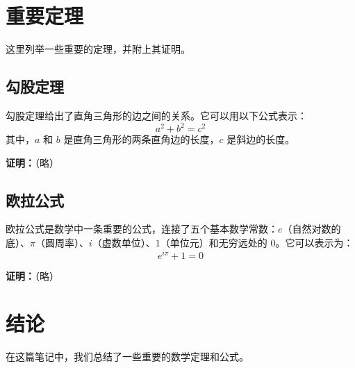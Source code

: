 \documentclass{article}
\begin{document}
	\section{重要定理}
	这里列举一些重要的定理，并附上其证明。
		
	\subsection{勾股定理}
	勾股定理给出了直角三角形的边之间的关系。它可以用以下公式表示：
	\begin{equation}
		a^2 + b^2 = c^2
	\end{equation}
	其中，$a$ 和 $b$ 是直角三角形的两条直角边的长度，$c$ 是斜边的长度。
	
	\textbf{证明：}（略）
	
	\subsection{欧拉公式}
	欧拉公式是数学中一条重要的公式，连接了五个基本数学常数：$e$（自然对数的底）、$\pi$（圆周率）、$i$（虚数单位）、$1$（单位元）和无穷远处的 $0$。它可以表示为：
	\begin{equation}
		e^{i\pi} + 1 = 0
	\end{equation}
	
	\textbf{证明：}（略）
	
	\section{结论}
	在这篇笔记中，我们总结了一些重要的数学定理和公式。
	
\end{document}
